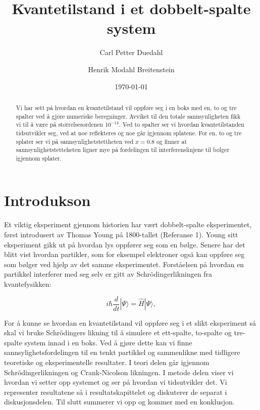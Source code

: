 \documentclass[reprint,english,notitlepage]{revtex4-2}  %
\begin{document}
\title{Kvantetilstand i et dobbelt-spalte system}   %
\author{Carl Petter Duedahl}               %
\author{Henrik Modahl Breitenstein}        %
\date{\today}                             %
\noaffiliation                            %
\begin{abstract}                          %
Vi har sett på hvordan en kvantetilstand vil oppføre seg i en boks med en, to og tre spalter ved å gjøre numeriske beregninger. Avviket til den totale sannsynligheten fikk vi til å være på størrelsesordenen $10^{-14}$. Ved to spalter ser vi hvordan kvantetilstanden tidsutvikler seg, ved at noe reflekteres og noe går igjennom splatene. For en, to og tre splater ser vi på sannsynlighetstettheten ved $x=0.8$ og finner at sannsynlighetstetteheten ligner mye på fordelingen til interferenslinjene til bølger igjennom splater.              %
\end{abstract}                            %
\maketitle                                %


\section{Introdukson}
Et viktig eksperiment gjennom historien har vært dobbelt-spalte eksperimentet, først introdusert av Thomas Young på 1800-tallet (Referanse 1). Young sitt eksperiment gikk ut på hvordan lys oppfører seg som en bølge. Senere har det blitt vist hvordan partikler, som for eksempel elektroner også kan oppføre seg som bølger ved hjelp av det samme eksperimentet. Forståelsen på hvordan en partikkel interferer med seg selv er gitt av Schrödingerlikningen fra kvantefysikken:

\begin{equation}
	i \hbar \frac{d}{dt} |\Psi\rangle = \hat{H} |\Psi\rangle,
\end{equation}

For å kunne se hvordan en kvantetilstand vil oppføre seg i et slikt eksperiment så skal vi bruke Schrödingers likning til å simulere et ett-spalte, to-spalte og tre-spalte system innad i en boks. Ved å gjøre dette kan vi finne sannsylighetsfordelingen til en tenkt partikkel og sammenlikne med tidligere teoretiske og eksperimentelle resultater. I teori delen går igjennom Schrödingerlikningen og Crank-Nicolson likningen. I metode delen viser vi hvordan vi setter opp systemet og ser på hvordan vi tidsutvikler det. Vi representer resultatene så i resultatskapittelet og diskuterer de separat i diskusjonsdelen. Til slutt summerer vi opp og kommer med en konklusjon.
\end{document}
